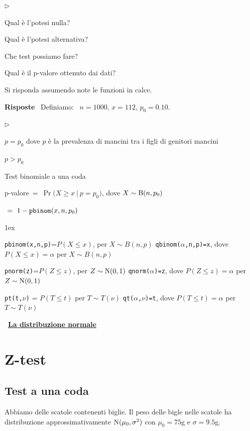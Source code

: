\documentclass[11pt,openany]{book}
\newcommand{\mylabel}[1]{{\footnotesize\textsf{#1}}\hfill}
\renewenvironment{itemize}
  {\begin{list}{$\triangleright$}{%
   \setlength{\parskip}{0mm}
   \setlength{\topsep}{.2\baselineskip}
   \setlength{\rightmargin}{0mm}
   \setlength{\listparindent}{0mm}
   \setlength{\itemindent}{0mm}
   \setlength{\labelwidth}{3ex}
   \setlength{\itemsep}{.4\baselineskip}
   \setlength{\parsep}{0mm}
   \setlength{\partopsep}{0mm}
   \setlength{\labelsep}{1ex}
   \setlength{\leftmargin}{\labelwidth+\labelsep}
   \let\makelabel\mylabel}}{%
   \end{list}\vspace*{-1.3mm}}
\begin{document}
\begin{itemize}
\item[1.] Qual è l'potesi nulla?

\item[2.] Qual è l'potesi alternativa?

\item[3.] Che test possiamo fare?

\item[4.] Qual è il p-valore ottenuto dai dati?
\end{itemize}
Si risponda assumendo note le funzioni in calce.

\textbf{Risposte} \ Definiamo: \ $n=1000$,\quad
$x=112$,\quad
$p_0=0.10$.

\begin{itemize}
\item[1.] $p=p_0$ dove $p$ è la prevalenza di mancini tra i figli di genitori mancini
\item[2.]  $p>p_0$ 
\item[3.] Test binomiale a una coda
\item[4.] p-valore$\ =\ \Pr\big(X\ge x\ \mathbin\big|\ p=p_0\big)$, dove $X\sim{\rm B}(n,p_0)$ \medskip

\phantom{p-valore}$\ =\ 1 -{\tt  pbinom}(x,n,p_0)$
\end{itemize}


\vfill
\parskip1ex
{\hrulefill\scriptsize

{\tt pbinom(x,n,p)}=$P(X\le x)$, per $X\sim B(n,p)$
\hfill 
{\tt qbinom($\alpha$,n,p)=x},  dove $P(X\le x)=\alpha$ per $X\sim B(n,p)$

{\tt pnorm(z)}=$P(Z\le z)$, per $Z\sim {\rm N}(0,1)$
\hfill 
{\tt qnorm($\alpha$)=z},  dove $P(Z\le z)=\alpha$ per $Z\sim {\rm N}(0,1)$

{\tt pt(t,$\nu$)} = $P(T\le t)$ per $T\sim T(\nu)$
\hfill
{\tt qt($\alpha$,$\nu$)=t}, dove $P(T\le t)=\alpha$ per $T\sim T(\nu)$

}


\clearpage\
\hfill\textbf{{\color{brown}\hyperref[distribuzione normale]{La distribuzione normale \faShare}}}
\section{Z-test}
\label{Z-test}
\subsection{Test a una coda}
Abbiamo delle scatole contenenti biglie.
Il peso delle bigle nelle scatole ha distribuzione approssimativamente  ${\rm N}(\mu_0,\sigma^2)$ con $\mu_0=75$g e $\sigma=9.5$g. 
\end{document}
